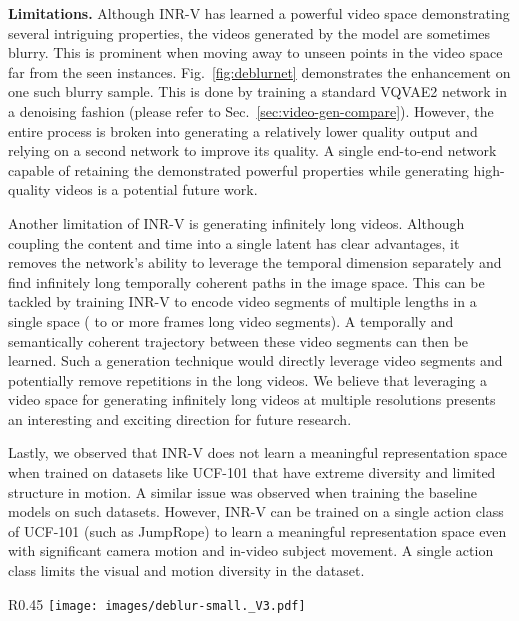 \documentclass[10pt]{article} \usepackage[accepted]{tmlr}
\begin{document}
\textbf{Limitations. }Although INR-V has learned a powerful video space demonstrating several intriguing properties, the videos generated by the model are sometimes blurry. This is prominent when moving away to unseen points in the video space far from the seen instances. Fig.~\ref{fig:deblurnet} demonstrates the enhancement on one such blurry sample. This is done by training a standard VQVAE2 network in a denoising fashion (please refer to Sec.~\ref{sec:video-gen-compare}). However, the entire process is broken into generating a relatively lower quality output and relying on a second network to improve its quality. A single end-to-end network capable of retaining the demonstrated powerful properties while generating high-quality videos is a potential future work.

Another limitation of INR-V is generating infinitely long videos. Although coupling the content and time into a single latent has clear advantages, it removes the network's ability to leverage the temporal dimension separately and find infinitely long temporally coherent paths in the image space. This can be tackled by training INR-V to encode video segments of multiple lengths in a single space  ( to  or more frames long video segments). A temporally and semantically coherent trajectory between these video segments can then be learned. Such a generation technique would directly leverage video segments and potentially remove repetitions in the long videos. We believe that leveraging a video space for generating infinitely long videos at multiple resolutions presents an interesting and exciting direction for future research.

Lastly, we observed that INR-V does not learn a meaningful representation space when trained on datasets like UCF-101 that have extreme diversity and limited structure in motion. A similar issue was observed when training the baseline models on such datasets.
However, INR-V can be trained on a single action class of UCF-101 (such as JumpRope) to learn a meaningful representation space even with significant camera motion and in-video subject movement. A single action class limits the visual and motion diversity in the dataset. 



\begin{wrapfigure}[]{R}{0.45\textwidth}
    \centering
    \vspace{-10pt}
    \texttt{[image: images/deblur-small.\_V3.pdf]}
    \caption{\small Denoising VQVAE2 reconstructions to enhance the visual quality of relatively blurry videos generated by INR-V. 
    Please refer Sec.~\ref{sec:video-gen-compare}.}
    \label{fig:deblurnet}
  
\end{wrapfigure}
\end{document}
